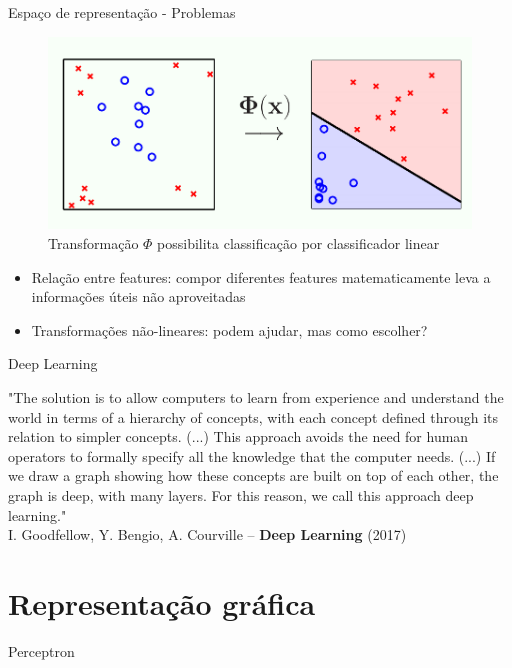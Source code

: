 \documentclass[10pt]{beamer}
\begin{document}
\begin{frame}[fragile]{Espaço de representação - Problemas}
\begin{figure}
	\centering
		\includegraphics[height=0.35\textwidth]		{images/nonlinear_transform.png}
    \caption{Transformação $\Phi$ possibilita classificação por classificador linear \cite{MostafaLD2012}}
\end{figure}
\begin{itemize}
	\item Relação entre features: compor diferentes features matematicamente leva a informações úteis não aproveitadas
    \item Transformações não-lineares: podem ajudar, mas como escolher?
\end{itemize}
\end{frame}

\begin{frame}[fragile]{Deep Learning}
	\begin{exampleblock}{}
   		"The solution is to allow computers to \alert{learn from experience} and understand the world in terms of a hierarchy of concepts, with each concept defined through its relation to simpler concepts. (...) This approach \alert{avoids the need for human operators to formally specify} all the knowledge that the computer needs. (...) If we draw a graph showing how these concepts are built on top of each other, the \alert{graph is deep}, with many layers. For this reason, we call this approach \alert{deep learning}."\\
        
I. Goodfellow, Y. Bengio, A. Courville -- \textbf{Deep Learning} (2017)
    \end{exampleblock}
\end{frame}

\section{Representação gráfica}

\begin{frame}[fragile]{Perceptron}

\end{frame}
\end{document}
